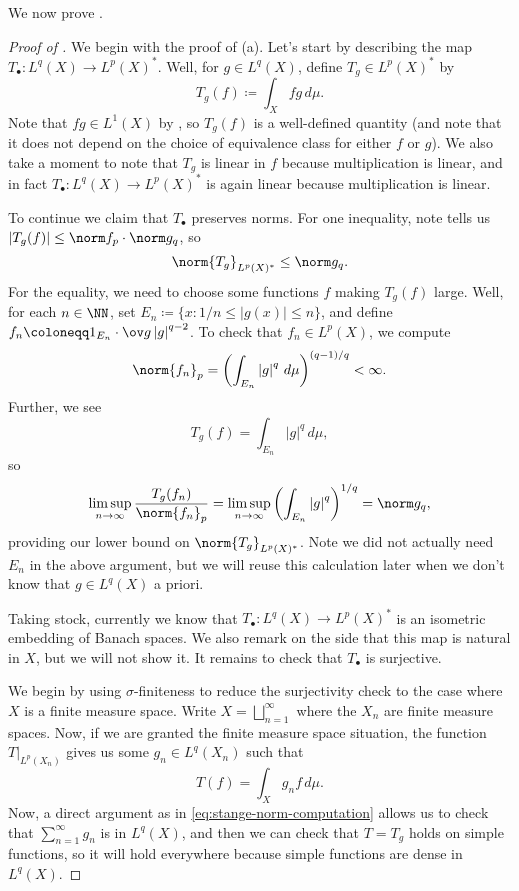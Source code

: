 \documentclass[../notes.tex]{subfiles}
\begin{document}
We now prove .
\begin{proof}[Proof of ]
	We begin with the proof of (a). Let's start by describing the map $T_\bullet\colon L^q(X)\to L^p(X)^*$. Well, for $g\in L^q(X)$, define $T_g\in L^p(X)^*$ by
	\[T_g(f)\coloneqq\int_Xfg\,d\mu.\]
	Note that $fg\in L^1(X)$ by , so $T_g(f)$ is a well-defined quantity (and note that it does not depend on the choice of equivalence class for either $f$ or $g$). We also take a moment to note that $T_g$ is linear in $f$ because multiplication is linear, and in fact $T_\bullet\colon L^q(X)\to L^p(X)^*$ is again linear because multiplication is linear.
	
	To continue we claim that $T_\bullet$ preserves norms. For one inequality, note  tells us $\left|T_g(f)\right|\le\norm f_p\cdot\norm g_q$, so
	\[\norm{T_g}_{L^p(X)^*}\le\norm g_q.\]
	For the equality, we need to choose some functions $f$ making $T_g(f)$ large. Well, for each $n\in\NN$, set $E_n\coloneqq\{x:1/n\le\left|g(x)\right|\le n\}$, and define $f_n\coloneqq 1_{E_n}\cdot\ov g\left|g\right|^{q-2}$. To check that $f_n\in L^p(X)$, we compute
	\[\norm{f_n}_p=\left(\int_{E_n}\left|g\right|^q\,d\mu\right)^{(q-1)/q}<\infty.\]
	Further, we see
	\[T_g(f)=\int_{E_n}\left|g\right|^q\,d\mu,\]
	so
	\begin{equation}
		\limsup_{n\to\infty}\frac{T_g(f_n)}{\norm{f_n}_p}=\limsup_{n\to\infty}\left(\int_{E_n}\left|g\right|^q\right)^{1/q}=\norm g_q, \label{eq:stange-norm-computation}
	\end{equation}
	providing our lower bound on $\norm{T_g}_{L^p(X)^*}$. Note we did not actually need $E_n$ in the above argument, but we will reuse this calculation later when we don't know that $g\in L^q(X)$ a priori.

	Taking stock, currently we know that $T_\bullet\colon L^q(X)\to L^p(X)^*$ is an isometric embedding of Banach spaces. We also remark on the side that this map is natural in $X$, but we will not show it. It remains to check that $T_\bullet$ is surjective.

	We begin by using $\sigma$-finiteness to reduce the surjectivity check to the case where $X$ is a finite measure space. Write $X=\bigsqcup_{n=1}^\infty$ where the $X_n$ are finite measure spaces. Now, if we are granted the finite measure space situation, the function $T|_{L^p(X_n)}$ gives us some $g_n\in L^q(X_n)$ such that
	\[T(f)=\int_Xg_nf\,d\mu.\]
	Now, a direct argument as in \eqref{eq:stange-norm-computation} allows us to check that $\sum_{n=1}^\infty g_n$ is in $L^q(X)$, and then we can check that $T=T_g$ holds on simple functions, so it will hold everywhere because simple functions are dense in $L^q(X)$.


\end{proof}
\end{document}
